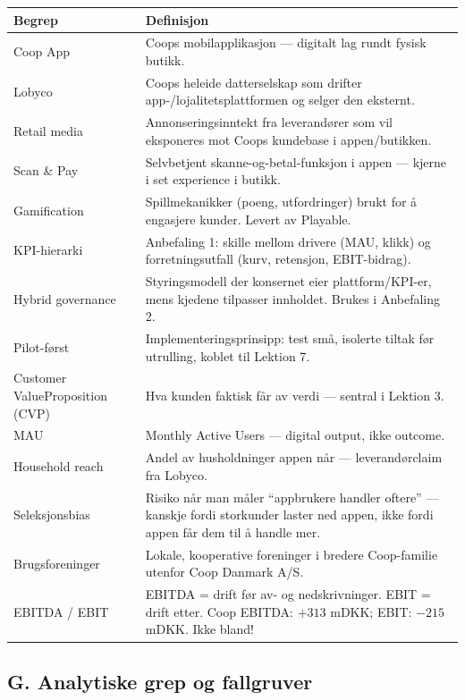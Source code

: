 \begin{tabular}{p{3.8cm}p{12cm}}
\hline
\textbf{Begrep} & \textbf{Definisjon} \\
\hline
Coop App & Coops mobilapplikasjon --- digitalt lag rundt fysisk butikk. \\
\hline
Lobyco & Coops heleide datterselskap som drifter app-/lojalitetsplattformen og
selger den eksternt. \\
\hline
Retail media & Annonseringsinntekt fra leverandører som vil eksponeres mot
Coops kundebase i appen/butikken. \\
\hline
Scan \& Pay & Selvbetjent skanne-og-betal-funksjon i appen --- kjerne i set
experience i butikk. \\
\hline
Gamification & Spillmekanikker (poeng, utfordringer) brukt for å engasjere
kunder. Levert av Playable. \\
\hline
KPI-hierarki & Anbefaling 1: skille mellom drivere (MAU, klikk) og
forretningsutfall (kurv, retensjon, EBIT-bidrag). \\
\hline
Hybrid governance & Styringsmodell der konsernet eier plattform/KPI-er, mens
kjedene tilpasser innholdet. Brukes i Anbefaling 2. \\
\hline
Pilot-først & Implementeringsprinsipp: test små, isolerte tiltak før
utrulling, koblet til Lektion 7. \\
\hline
Customer Value\newline Proposition (CVP) & Hva kunden faktisk får av verdi
--- sentral i Lektion 3. \\
\hline
MAU & Monthly Active Users --- digital output, ikke outcome. \\
\hline
Household reach & Andel av husholdninger appen når --- leverandørclaim fra
Lobyco. \\
\hline
Seleksjonsbias & Risiko når man måler ``appbrukere handler oftere'' --- kanskje
fordi storkunder laster ned appen, ikke fordi appen får dem til å handle mer. \\
\hline
Brugsforeninger & Lokale, kooperative foreninger i bredere Coop-familie
utenfor Coop Danmark A/S. \\
\hline
EBITDA / EBIT & EBITDA = drift før av- og nedskrivninger. EBIT = drift etter.
Coop EBITDA: $+313$ mDKK; EBIT: $-215$ mDKK. Ikke bland! \\
\hline
\end{tabular}

\subsection*{G. Analytiske grep og fallgruver}

